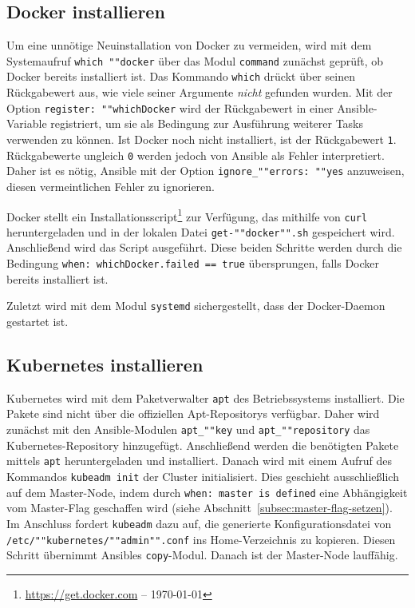 \subsection{Docker installieren}\label{subsec:docker-installieren}

Um eine unnötige Neuinstallation von Docker zu vermeiden, wird mit dem Systemaufruf \texttt{which ""docker} über das Modul \texttt{command} zunächst geprüft, ob Docker bereits installiert ist.
Das Kommando \texttt{which} drückt über seinen Rückgabewert aus, wie viele seiner Argumente \emph{nicht} gefunden wurden.
Mit der Option \texttt{register: ""whichDocker} wird der Rückgabewert in einer Ansible-Variable registriert, um sie als Bedingung zur Ausführung weiterer Tasks verwenden zu können.
Ist Docker noch nicht installiert, ist der Rückgabewert \texttt{1}.
Rückgabewerte ungleich \texttt{0} werden jedoch von Ansible als Fehler interpretiert.
Daher ist es nötig, Ansible mit der Option \texttt{ignore\_""errors: ""yes} anzuweisen, diesen vermeintlichen Fehler zu ignorieren.

Docker stellt ein Installationsscript\footnote{\url{https://get.docker.com} -- \today} zur Verfügung, das mithilfe von \texttt{curl} heruntergeladen und in der lokalen Datei \texttt{get-""docker"".sh} gespeichert wird.
Anschließend wird das Script ausgeführt.
Diese beiden Schritte werden durch die Bedingung \texttt{when: whichDocker.failed == true} übersprungen, falls Docker bereits installiert ist.

Zuletzt wird mit dem Modul \texttt{systemd} sichergestellt, dass der Docker-Daemon gestartet ist.

\subsection{Kubernetes installieren}\label{subsec:kubernetes-installieren}

Kubernetes wird mit dem Paketverwalter \texttt{apt} des Betriebssystems installiert.
Die Pakete sind nicht über die offiziellen Apt-Repositorys verfügbar.
Daher wird zunächst mit den Ansible-Modulen \texttt{apt\_""key} und \texttt{apt\_""repository} das Kubernetes-Repository hinzugefügt.
Anschließend werden die benötigten Pakete mittels \texttt{apt} heruntergeladen und installiert.
Danach wird mit einem Aufruf des Kommandos \texttt{kubeadm init} der Cluster initialisiert.
Dies geschieht ausschließlich auf dem Master-Node, indem durch \texttt{when: master is defined} eine Abhängigkeit vom Master-Flag geschaffen wird (siehe Abschnitt~\ref{subsec:master-flag-setzen}).
Im Anschluss fordert \texttt{kubeadm} dazu auf, die generierte Konfigurationsdatei von \texttt{/etc/""kubernetes/""admin"".conf} ins Home-Verzeichnis zu kopieren.
Diesen Schritt übernimmt Ansibles \texttt{copy}-Modul.
Danach ist der Master-Node lauffähig.

